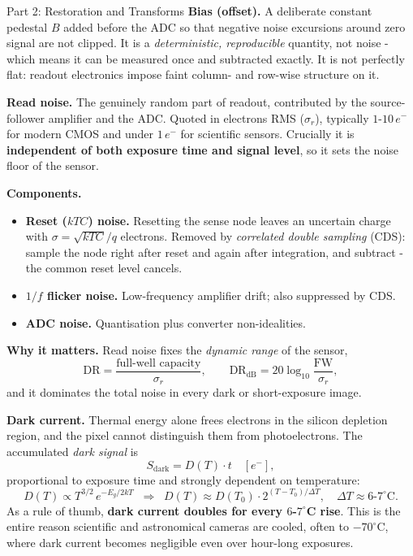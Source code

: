 \documentclass[letterpaper]{article}
\begin{document}
\begin{notes}{Part 2: Restoration and Transforms}
\textbf{Bias (offset).} A deliberate constant pedestal $B$ added before the ADC so that negative noise excursions around zero signal are not clipped. It is a \emph{deterministic, reproducible} quantity, not noise - which means it can be measured once and subtracted exactly. It is not perfectly flat: readout electronics impose faint column- and row-wise structure on it.

\textbf{Read noise.} The genuinely random part of readout, contributed by the source-follower amplifier and the ADC. Quoted in electrons RMS ($\sigma_r$), typically $1$-$10\,e^-$ for modern CMOS and under $1\,e^-$ for scientific sensors. Crucially it is \textbf{independent of both exposure time and signal level}, so it sets the noise floor of the sensor.

\textbf{Components.}
\begin{itemize}
    \item \textbf{Reset ($kTC$) noise.} Resetting the sense node leaves an uncertain charge with $\sigma = \sqrt{kTC}/q$ electrons. Removed by \emph{correlated double sampling} (CDS): sample the node right after reset and again after integration, and subtract - the common reset level cancels.
    \item \textbf{$1/f$ flicker noise.} Low-frequency amplifier drift; also suppressed by CDS.
    \item \textbf{ADC noise.} Quantisation plus converter non-idealities.
\end{itemize}

\textbf{Why it matters.} Read noise fixes the \emph{dynamic range} of the sensor,
$$\mathrm{DR} = \frac{\text{full-well capacity}}{\sigma_r},\qquad \mathrm{DR_{dB}} = 20\log_{10}\frac{\text{FW}}{\sigma_r},$$
and it dominates the total noise in every dark or short-exposure image.


\textbf{Dark current.} Thermal energy alone frees electrons in the silicon depletion region, and the pixel cannot distinguish them from photoelectrons. The accumulated \emph{dark signal} is
$$S_{\text{dark}} = D(T)\cdot t \quad [e^-],$$
proportional to exposure time and strongly dependent on temperature:
$$D(T) \propto T^{3/2}\,e^{-E_g/2kT} \;\;\Longrightarrow\;\; D(T) \approx D(T_0)\cdot 2^{(T-T_0)/\Delta T},\quad \Delta T\approx 6\text{-}7^\circ\mathrm{C}.$$
As a rule of thumb, \textbf{dark current doubles for every $6$-$7^\circ$C rise}. This is the entire reason scientific and astronomical cameras are cooled, often to $-70^\circ$C, where dark current becomes negligible even over hour-long exposures.


\end{notes}
\end{document}
